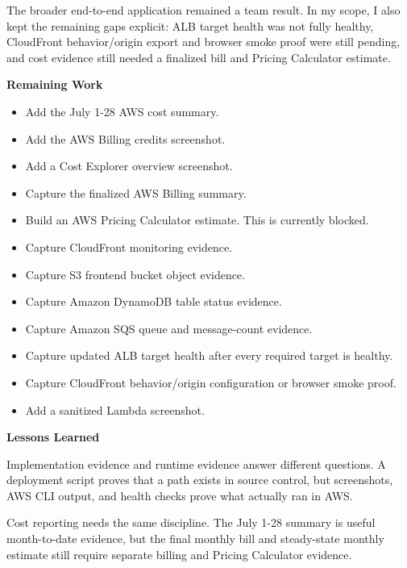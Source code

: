 The broader end-to-end application remained a team result. In my scope,
I also kept the remaining gaps explicit: ALB target health was not fully
healthy, CloudFront behavior/origin export and browser smoke proof were
still pending, and cost evidence still needed a finalized bill and
Pricing Calculator estimate.

\vspace{0.5em}\noindent\textbf{Remaining Work}\par

\begin{itemize}
\tightlist
\item[$\boxtimes$]
  Add the July 1-28 AWS cost summary.
\item[$\boxtimes$]
  Add the AWS Billing credits screenshot.
\item[$\boxtimes$]
  Add a Cost Explorer overview screenshot.
\item[$\square$]
  Capture the finalized AWS Billing summary.
\item[$\square$]
  Build an AWS Pricing Calculator estimate. This is currently blocked.
\item[$\boxtimes$]
  Capture CloudFront monitoring evidence.
\item[$\boxtimes$]
  Capture S3 frontend bucket object evidence.
\item[$\boxtimes$]
  Capture Amazon DynamoDB table status evidence.
\item[$\boxtimes$]
  Capture Amazon SQS queue and message-count evidence.
\item[$\square$]
  Capture updated ALB target health after every required target is
  healthy.
\item[$\square$]
  Capture CloudFront behavior/origin configuration or browser smoke
  proof.
\item[$\boxtimes$]
  Add a sanitized Lambda screenshot.
\end{itemize}

\vspace{0.5em}\noindent\textbf{Lessons Learned}\par

Implementation evidence and runtime evidence answer different questions.
A deployment script proves that a path exists in source control, but
screenshots, AWS CLI output, and health checks prove what actually ran
in AWS.

Cost reporting needs the same discipline. The July 1-28 summary is
useful month-to-date evidence, but the final monthly bill and
steady-state monthly estimate still require separate billing and Pricing
Calculator evidence.
